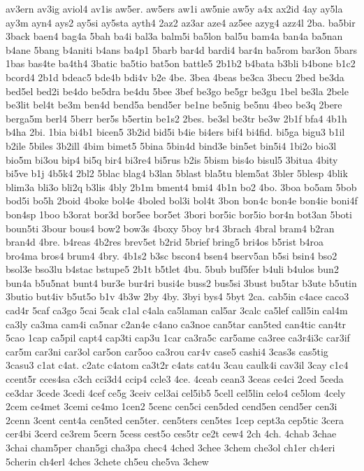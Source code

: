 {av3ern
av3ig
aviol4
av1is
aw5er.
aw5ers
aw1i
aw5nie
aw5y
a4x
ax2id
4ay
ay5la
ay3m
ayn4
ays2
ay5si
ay5sta
ayth4
2az2
az3ar
aze4
az5ee
azyg4
azz4l
2ba.
ba5bir
3back
baen4
bag4a
5bah
ba4i
bal3a
balm5i
ba5lon
bal5u
bam4a
ban4a
ba5nan
b4ane
5bang
b4aniti
b4ans
ba4p1
5barb
bar4d
bardi4
bar4n
ba5rom
bar3on
5bars
1bas
bas4te
ba4th4
3batic
ba5tio
bat5on
battle5
2b1b2
b4bata
b3bli
b4bone
b1c2
bcord4
2b1d
bdeac5
bde4b
bdi4v
b2e
4be.
3bea
4beas
be3ca
3becu
2bed
be3da
bed5el
bed2i
be4do
be5dra
be4du
5bee
3bef
be3go
be5gr
be3gu
1bel
be3la
2bele
be3lit
bel4t
be3m
ben4d
bend5a
bend5er
be1ne
be5nig
be5nu
4beo
be3q
2bere
berga5m
berl4
5berr
ber5s
b5ertin
be1s2
2bes.
be3sl
be3tr
be3w
2b1f
bfa4
4b1h
b4ha
2bi.
1bia
bi4b1
bicen5
3b2id
bid5i
b4ie
bi4ers
bif4
bi4fid.
bi5ga
bigu3
b1il
b2ile
5biles
3b2ill
4bim
bimet5
5bina
5bin4d
bind3e
bin5et
bin5i4
1bi2o
bio3l
bio5m
bi3ou
bip4
bi5q
bir4
bi3re4
bi5rus
b2is
5bism
bis4o
bisul5
3bitua
4bity
bi5ve
b1j
4b5k4
2bl2
5blac
blag4
b3lan
5blast
bla5tu
blem5at
3bler
5blesp
4blik
blim3a
bli3o
bli2q
b3lis
4bly
2b1m
bment4
bmi4
4b1n
bo2
4bo.
3boa
bo5am
5bob
bod5i
bo5h
2boid
4boke
bol4e
4boled
bol3i
bol4t
3bon
bon4c
bon4e
bon4ie
boni4f
bon4sp
1boo
b3orat
bor3d
bor5ee
bor5et
3bori
bor5ic
bor5io
bor4n
bot3an
5boti
boun5ti
3bour
bous4
bow2
bow3s
4boxy
5boy
br4
3brach
4bral
bram4
b2ran
bran4d
4bre.
b4reas
4b2res
brev5et
b2rid
5brief
bring5
bri4os
b5rist
b4roa
bro4ma
bros4
brum4
4bry.
4b1s2
b3sc
bscon4
bsen4
bserv5an
b5si
bsin4
bso2
bsol3e
bso3lu
b4stac
bstupe5
2b1t
b5tlet
4bu.
5bub
buf5fer
b4uli
b4ulos
bun2
bun4a
b5u5nat
bunt4
bur3e
bur4ri
busi4e
buss2
bus5si
3bust
bu5tar
b3ute
b5utin
3butio
but4iv
b5ut5o
b1v
4b3w
2by
4by.
3byi
bys4
5byt
2ca.
cab5in
c4ace
caco3
cad4r
5caf
ca3go
5cai
5cak
c1al
c4ala
ca5laman
cal5ar
3calc
ca5lef
call5in
cal4m
ca3ly
ca3ma
cam4i
ca5nar
c2an4e
c4ano
ca3noe
can5tar
can5ted
can4tic
can4tr
5cao
1cap
ca5pil
capt4
cap3ti
cap3u
1car
ca3ra5c
car5ame
ca3ree
ca3r4i3c
car3if
car5m
car3ni
car3ol
car5on
car5oo
ca3rou
car4v
case5
cashi4
3cas3s
cas5tig
3casu3
c1at
c4at.
c2atc
c4atom
ca3t2r
c4ats
cat4u
3cau
caulk4i
cav3il
3cay
c1c4
ccent5r
cces4sa
c3ch
cci3d4
ccip4
ccle3
4ce.
4ceab
cean3
3ceas
ce4ci
2ced
5ceda
ce3dar
3cede
3cedi
4cef
ce5g
3ceiv
cel3ai
cel5ib5
5cell
cel5lin
celo4
ce5lom
4cely
2cem
ce4met
3cemi
ce4mo
1cen2
5cenc
cen5ci
cen5ded
cend5en
cend5er
cen3i
2cenn
3cent
cent4a
cen5ted
cen5ter.
cen5ters
cen5tes
1cep
cept3a
cep5tic
3cera
cer4bi
3cerd
ce3rem
5cern
5cess
cest5o
ces5tr
ce2t
cew4
2ch
4ch.
4chab
3chae
3chai
cham5per
chan5gi
cha3pa
chec4
4ched
3chee
3chem
che3ol
ch1er
ch4eri
5cherin
ch4erl
4ches
3chete
ch5eu
che5va
3chew
}
